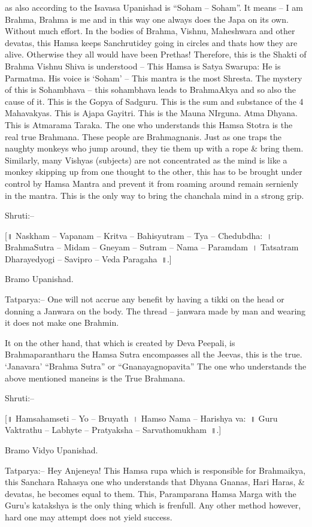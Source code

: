 as also according to the Isavasa Upanishad is “Soham – Soham”. It means – I am Brahma, Brahma is me and in this way one always does the Japa on its own. Without much effort. In the bodies of Brahma, Vishnu, Maheshwara and other devatas, this Hamsa keeps Sanchrutidey going in circles and thats how they are alive. Otherwise they all would have been Prethas! Therefore, this is the Shakti of Brahma Vishnu Shiva is understood – This Hamsa is Satya Swarupa: He is Parmatma. His voice is ‘Soham’ – This mantra is the most Shresta. The mystery of this is Sohambhava – this sohambhava leads to BrahmaAkya and so also the cause of it. This is the Gopya of Sadguru. This is the sum and substance of the 4 Mahavakyas. This is Ajapa Gayitri. This is the Mauna NIrguna. Atma Dhyana. This is Atmarama Taraka. The one who understands this Hamsa Stotra is the real true Brahmana. These people are Brahmagnanis. Just as one traps the naughty monkeys who jump around, they tie them up with a rope \& bring them. Similarly, many Vishyas (subjects) are not concentrated as the mind is like a monkey skipping up from one thought to the other, this has to be brought under control by Hamsa Mantra and prevent it from roaming around remain sernienly in the mantra. This is the only way to bring the chanchala mind in a strong grip.

Shruti:–

[॥ Naskham – Vapanam – Kritva – Bahisyutram – Tya – Chedubdha:~। BrahmaSutra – Midam – Gneyam – Sutram – Nama – Paramdam~। Tatsatram Dharayedyogi – Savipro – Veda Paragaha~॥.]

Bramo Upanishad.

Tatparya:– One will not accrue any benefit by having a tikki on the head or donning a Janwara on the body. The thread – janwara made by man and wearing it does not make one Brahmin.

It on the other hand, that which is created by Deva Peepali, is Brahmaparantharu the Hamsa Sutra encompasses all the Jeevas, this is the true. ‘Janavara’ “Brahma Sutra” or “Gnanayagnopavita” The one who understands the above mentioned maneins is the True Brahmana.

Shruti:–

[॥ Hamsahamseti – Yo – Bruyath~। Hamso Nama – Harishya va:~॥ Guru Vaktrathu – Labhyte – Pratyaksha – Sarvathomukham~॥.]

Bramo Vidyo Upanishad.

Tatparya:– Hey Anjeneya! This Hamsa rupa which is responsible for Brahmaikya, this Sanchara Rahasya one who understands that Dhyana Gnanas, Hari Haras, \& devatas, he becomes equal to them. This, Paramparana Hamsa Marga with the Guru's katakshya is the only thing which is frenfull. Any other method however, hard one may attempt does not yield success.

